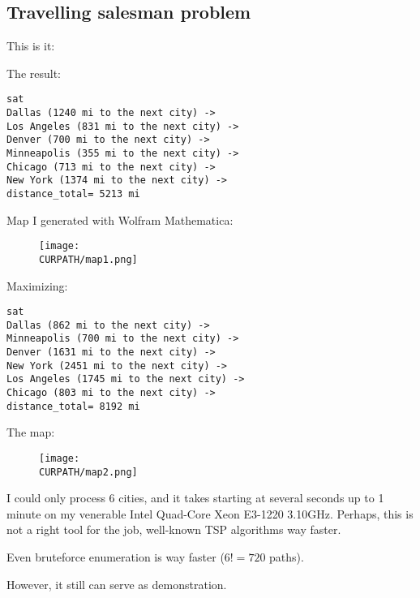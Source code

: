 \subsection{Travelling salesman problem}

\renewcommand{\CURPATH}{MaxSMT/TSP}

This is it:



The result:

\begin{lstlisting}
sat
Dallas (1240 mi to the next city) ->
Los Angeles (831 mi to the next city) ->
Denver (700 mi to the next city) ->
Minneapolis (355 mi to the next city) ->
Chicago (713 mi to the next city) ->
New York (1374 mi to the next city) ->
distance_total= 5213 mi
\end{lstlisting}

Map I generated with Wolfram Mathematica:

\begin{figure}[H]
\centering
\texttt{[image: \\CURPATH/map1.png]}
\caption{}
\end{figure}

Maximizing:

\begin{lstlisting}
sat
Dallas (862 mi to the next city) ->
Minneapolis (700 mi to the next city) ->
Denver (1631 mi to the next city) ->
New York (2451 mi to the next city) ->
Los Angeles (1745 mi to the next city) ->
Chicago (803 mi to the next city) ->
distance_total= 8192 mi
\end{lstlisting}

The map:

\begin{figure}[H]
\centering
\texttt{[image: \\CURPATH/map2.png]}
\caption{}
\end{figure}

I could only process 6 cities, and it takes starting at several seconds up to 1 minute on my venerable Intel Quad-Core Xeon E3-1220 3.10GHz.
Perhaps, this is not a right tool for the job, well-known TSP algorithms way faster.

Even bruteforce enumeration is way faster ($6!=720$ paths).

However, it still can serve as demonstration.

